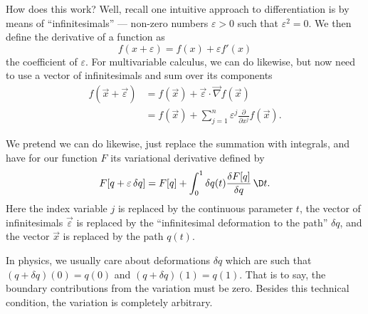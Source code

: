 How does this work? Well, recall one intuitive approach to
differentiation is by means of ``infinitesimals'' --- non-zero numbers
$\varepsilon>0$ such that $\varepsilon^{2}=0$. We then define the
derivative of a function as
\begin{equation}
f(x + \varepsilon) = f(x) + \varepsilon f'(x) 
\end{equation}
the coefficient of $\varepsilon$. For multivariable calculus, we can do
likewise, but now need to use a vector of infinitesimals and sum over
its components
\begin{equation}
  \begin{split}
f(\vec{x} + \vec{\varepsilon}) &= f(\vec{x}) + \vec{\varepsilon}\cdot\vec{\nabla}f(\vec{x})\\
&= f(\vec{x}) + \sum^{n}_{j=1}\varepsilon^{j}\frac{\partial}{\partial x^{j}}f(\vec{x}).
  \end{split}
\end{equation}

We pretend we can do likewise, just replace the summation with
integrals, and have for our function $F$ its variational derivative defined by
\begin{equation}
F[q + \varepsilon\,\delta q] = F[q] + \int^{1}_{0}\delta
q(t)\frac{\delta F[q]}{\delta q}\,\D t.
\end{equation}
Here the index variable $j$ is replaced by the continuous parameter $t$,
the vector of infinitesimals $\vec{\varepsilon}$ is replaced by the
``infinitesimal deformation to the path'' $\delta q$, and the vector
$\vec{x}$ is replaced by the path $q(t)$.

In physics, we usually care about deformations $\delta q$ which are such
that $(q + \delta q)(0) = q(0)$ and $(q + \delta q)(1)=q(1)$. That is to
say, the boundary contributions from the variation must be zero. Besides
this technical condition, the variation is completely arbitrary. 

